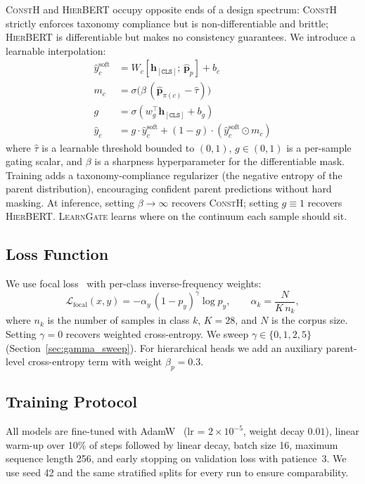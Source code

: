 \documentclass{article}
\newcommand{\modB}{\textsc{ConstH}}
\newcommand{\modC}{\textsc{HierBERT}}
\newcommand{\modD}{\textsc{LearnGate}}
\newcommand{\hcls}{\mathbf{h}_{[\texttt{CLS}]}}
\begin{document}
\modB{} and \modC{} occupy opposite ends of a design spectrum:
\modB{} strictly enforces taxonomy compliance but is non-differentiable
and brittle; \modC{} is differentiable but makes no consistency
guarantees.
We introduce a learnable interpolation:
\begin{align*}
\hat{y}_c^{\mathrm{soft}} &= W_c [\hcls;\,\hat{\mathbf{p}}_p] + b_c \\
m_c &= \sigma\bigl(\beta\,(\hat{\mathbf{p}}_{\pi(c)} - \hat{\tau})\bigr) \\
g   &= \sigma(w_g^\top \hcls + b_g) \\
\hat{y}_c &= g \cdot \hat{y}_c^{\mathrm{soft}} + (1-g)\cdot(\hat{y}_c^{\mathrm{soft}} \odot m_c)
\end{align*}
where $\hat{\tau}$ is a learnable threshold bounded to $(0,1)$,
$g \in (0,1)$ is a per-sample gating scalar, and
$\beta$ is a sharpness hyperparameter for the differentiable mask.
Training adds a taxonomy-compliance regularizer (the negative entropy
of the parent distribution), encouraging confident parent predictions
without hard masking.
At inference, setting $\beta\!\to\!\infty$ recovers \modB{};
setting $g\!\equiv\!1$ recovers \modC{}.
\modD{} learns where on the continuum each sample should sit.

\subsection{Loss Function}

We use focal loss~\cite{lin2017focal} with per-class inverse-frequency
weights:
\[
\mathcal{L}_{\mathrm{focal}}(x,y) =
-\alpha_y\,(1-p_y)^\gamma \log p_y,
\qquad
\alpha_k = \frac{N}{K\,n_k},
\]
where $n_k$ is the number of samples in class $k$, $K = 28$, and $N$
is the corpus size.
Setting $\gamma = 0$ recovers weighted cross-entropy.
We sweep $\gamma \in \{0, 1, 2, 5\}$ (Section~\ref{sec:gamma_sweep}).
For hierarchical heads we add an auxiliary parent-level
cross-entropy term with weight $\beta_p = 0.3$.

\subsection{Training Protocol}

All models are fine-tuned with AdamW~\cite{loshchilov2019adamw}
(lr = $2 \times 10^{-5}$, weight decay $0.01$), linear warm-up over
10\% of steps followed by linear decay, batch size 16, maximum
sequence length 256, and early stopping on validation loss with
patience~3.
We use seed 42 and the same stratified splits for every run to ensure
comparability.
\end{document}
